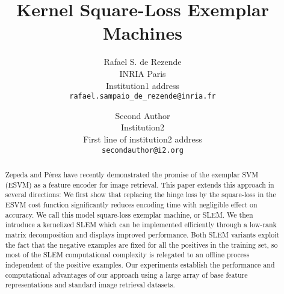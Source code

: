 \documentclass[10pt,twocolumn,letterpaper]{article}
\begin{document}
\title{Kernel Square-Loss Exemplar Machines}

\author{Rafael S. de Rezende\\
INRIA Paris\\
Institution1 address\\
{\tt\small rafael.sampaio_de_rezende@inria.fr}
\and
Second Author\\
Institution2\\
First line of institution2 address\\
{\tt\small secondauthor@i2.org}
}

\maketitle
\begin{abstract}
Zepeda and P\'erez \cite{ZePe15} have recently demonstrated the promise of the exemplar SVM (ESVM) as a feature encoder for image retrieval. This paper extends this approach in several directions:
We first show that replacing the hinge loss by the square-loss in the ESVM cost function significantly reduces encoding time with negligible effect on
accuracy.
We call this model square-loss exemplar machine, or SLEM. 
We then introduce a kernelized SLEM which can be implemented efficiently through a low-rank matrix decomposition and
displays improved performance. 
Both SLEM variants exploit the fact that the negative examples are fixed for all the positives in the training set, so most of the SLEM computational complexity is relegated to an offline process independent of the positive examples. 
Our experiments establish the performance and computational advantages of our approach using a large array of base feature representations and standard image retrieval datasets.
\end{abstract}
\end{document}
